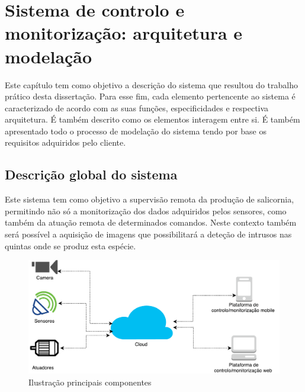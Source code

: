 

\chapter{Sistema de controlo e monitorização: arquitetura e modelação}


Este capítulo tem como objetivo a descrição do sistema que resultou do trabalho prático
desta dissertação. Para esse fim, cada elemento pertencente ao sistema é caracterizado de
acordo com as suas funções, especificidades e respectiva arquitetura. É também descrito como os elementos interagem entre si. É também apresentado todo o processo de modelação do sistema tendo por base os requisitos adquiridos pelo cliente. 








\section{Descrição global do sistema}

Este sistema tem como objetivo a supervisão remota da produção de salicornia,  permitindo não só a monitorização dos dados adquiridos pelos sensores, como também da atuação remota de determinados comandos. Neste contexto também será possível a aquisição de imagens que possibilitará a deteção de intrusos nas quintas onde se produz esta espécie.


\begin{figure}[!htb]
	\centering
	\includegraphics[scale=0.40]{esquemas/global_arquitetura.pdf}
	\caption{Ilustração principais componentes}
	\label{componentesall}
\end{figure}



